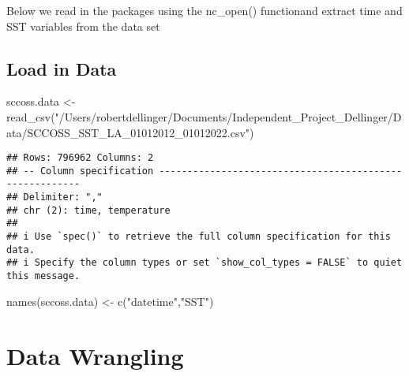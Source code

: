 \documentclass[]{tufte-handout}
\newenvironment{Shaded}{}{}
\newcommand{\FunctionTok}[1]{\textcolor[rgb]{0.02,0.16,0.49}{#1}}
\newcommand{\NormalTok}[1]{#1}
\newcommand{\OtherTok}[1]{\textcolor[rgb]{0.00,0.44,0.13}{#1}}
\newcommand{\StringTok}[1]{\textcolor[rgb]{0.25,0.44,0.63}{#1}}
\begin{document}
Below we read in the packages using the nc\_open() functionand extract
time and SST variables from the data set

\hypertarget{load-in-data}{%
\subsection{Load in Data}\label{load-in-data}}

\begin{Shaded}
\begin{Highlighting}[]
\NormalTok{sccoss.data }\OtherTok{\textless{}{-}} \FunctionTok{read\_csv}\NormalTok{(}\StringTok{"/Users/robertdellinger/Documents/Independent\_Project\_Dellinger/Data/SCCOSS\_SST\_LA\_01012012\_01012022.csv"}\NormalTok{)}
\end{Highlighting}
\end{Shaded}

\begin{verbatim}
## Rows: 796962 Columns: 2
## -- Column specification --------------------------------------------------------
## Delimiter: ","
## chr (2): time, temperature
## 
## i Use `spec()` to retrieve the full column specification for this data.
## i Specify the column types or set `show_col_types = FALSE` to quiet this message.
\end{verbatim}

\begin{Shaded}
\begin{Highlighting}[]
\FunctionTok{names}\NormalTok{(sccoss.data) }\OtherTok{\textless{}{-}} \FunctionTok{c}\NormalTok{(}\StringTok{"datetime"}\NormalTok{,}\StringTok{"SST"}\NormalTok{)}
\end{Highlighting}
\end{Shaded}

\hypertarget{data-wrangling}{%
\section{Data Wrangling}\label{data-wrangling}}
\end{document}
